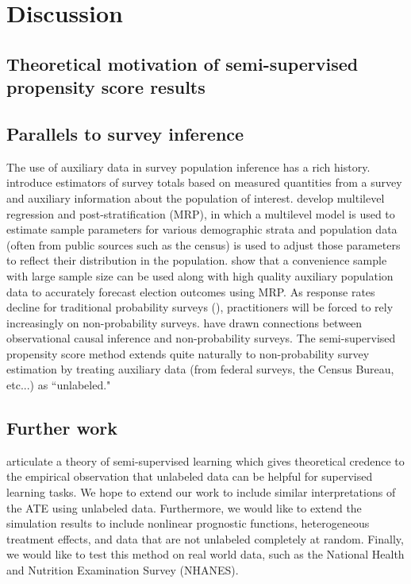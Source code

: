 \documentclass[aos]{imsart}
\begin{document}
\section{Discussion}

\subsection{Theoretical motivation of semi-supervised propensity score results}


\subsection{Parallels to survey inference}

The use of auxiliary data in survey population inference has a rich history. \cite{horvitz1952generalization} 
introduce estimators of survey totals based on measured quantities from a survey and auxiliary information about the population of interest.
\cite{GelmanLittle97} develop multilevel regression and post-stratification (MRP), 
in which a multilevel model is used to estimate sample parameters for various demographic strata and population data 
(often from public sources such as the census) is used to adjust those parameters to reflect their distribution in the population. 
\cite{WANG2015980} show that a convenience sample with large sample size can be used along with 
high quality auxiliary population data to accurately forecast election outcomes using MRP. 
As response rates decline for traditional probability surveys (\cite{kennedy2019response}), 
practitioners will be forced to rely increasingly on non-probability surveys.
\cite{mkks2017} have drawn connections between observational causal inference and non-probability surveys. 
The semi-supervised propensity score method extends quite naturally to non-probability survey estimation 
by treating auxiliary data (from federal surveys, the Census Bureau, etc...) as ``unlabeled."

\subsection{Further work}

\cite{belkin2006manifold} articulate a theory of semi-supervised learning which gives theoretical credence to the empirical observation 
that unlabeled data can be helpful for supervised learning tasks. We hope to extend our work to include similar interpretations of the ATE using unlabeled data. Furthermore, we would like to extend the simulation results to include nonlinear prognostic functions, heterogeneous treatment 
effects, and data that are not unlabeled completely at random.
Finally, we would like to test this method on real world data, such as the National Health and Nutrition Examination Survey (NHANES). 

 


\end{document}
